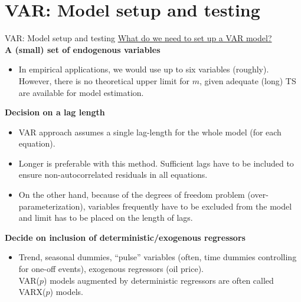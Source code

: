 \documentclass[usenames,dvipsnames]{beamer}
\begin{document}
\section{VAR: Model setup and testing}
\begin{frame}{VAR: Model setup and testing}
\small
\underline{What do we need to set up a VAR model?}\\
\vspace*{3mm}
\textbf{A (small) set of endogenous variables}
\vspace*{-1.5mm}
\begin{itemize}
\item In empirical applications, we would use up to six variables (roughly). However, there is no theoretical upper limit for $m$, given adequate (long) TS are available for model estimation.
\end{itemize}
\textbf{Decision on a lag length}
\vspace*{-1.3mm}
	\begin{itemize}
	\item VAR approach assumes a single lag-length for the whole model (for each equation).
	\vspace*{-0.7mm}
	\item Longer is preferable with this method. Sufficient lags have to be included to ensure non-autocorrelated residuals in all equations.
	\vspace*{-0.7mm}
	\item On the other hand, because of the degrees of freedom problem (over-parameterization), variables frequently have to be excluded from the model and limit has to be placed on the length of lags.
	\end{itemize}
\textbf{Decide on inclusion of deterministic/exogenous regressors}
\vspace*{-1.5mm}
\begin{itemize}
\item Trend,  seasonal dummies, ``pulse'' variables (often, time dummies controlling for one-off events), exogenous regressors (oil price). \\VAR($p$) models augmented by deterministic regressors are often called VARX($p$) models.
\end{itemize}
\end{frame}
\end{document}
